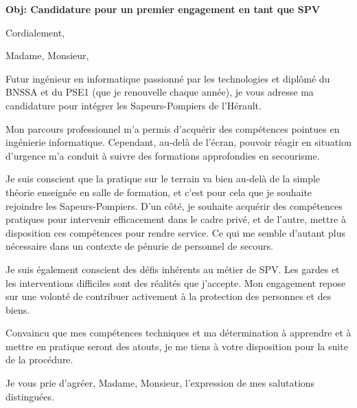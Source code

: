 \documentclass[a4paper,roman]{moderncv}
\begin{document}
\date{\today}
\opening{\textbf{Obj: Candidature pour un premier engagement en tant que SPV}}
\closing{Cordialement, \vspace{-1em}}


\makelettertitle%
Madame, Monsieur,

Futur ingénieur en informatique passionné par les technologies et diplômé du BNSSA et du PSE1 (que je renouvelle chaque année), je vous adresse ma candidature pour intégrer les Sapeurs-Pompiers de l'Hérault.

Mon parcours professionnel m'a permis d'acquérir des compétences pointues en ingénierie informatique. Cependant, au-delà de l'écran, pouvoir réagir en situation d'urgence m'a conduit à suivre des formations approfondies en secourisme.

Je suis conscient que la pratique sur le terrain va bien au-delà de la simple théorie enseignée en salle de formation, et c'est pour cela que je souhaite rejoindre les Sapeurs-Pompiers. D'un côté, je souhaite acquérir des compétences pratiques pour intervenir efficacement dans le cadre privé, et de l'autre, mettre à disposition ces compétences pour rendre service. Ce qui me semble d'autant plus nécessaire dans un contexte de pénurie de personnel de secours.

Je suis également conscient des défis inhérents au métier de SPV. Les gardes et les interventions difficiles sont des réalités que j'accepte. Mon engagement repose sur une volonté de contribuer activement à la protection des personnes et des biens.

Convaincu que mes compétences techniques et ma détermination à apprendre et à mettre en pratique seront des atouts, je me tiens à votre disposition pour la suite de la procédure.

Je vous prie d'agréer, Madame, Monsieur, l'expression de mes salutations distinguées.

\vspace{0.5cm}


\makeletterclosing%
\end{document}
